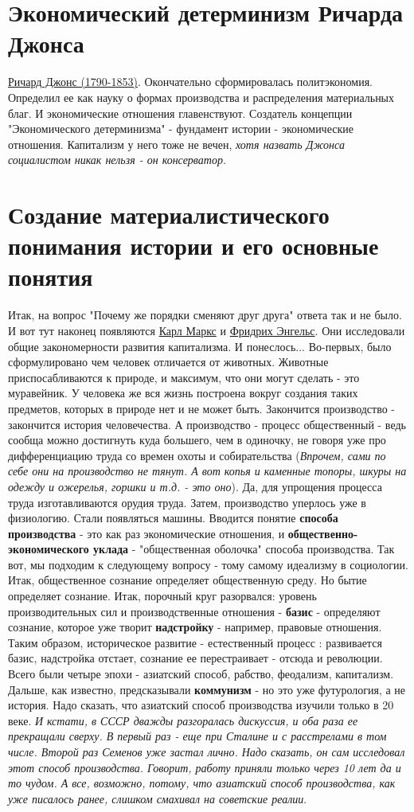 \section{Экономический детерминизм Ричарда Джонса}
\underline{Ричард Джонс (1790-1853)}. Окончательно сформировалась политэкономия. Определил ее как науку о формах производства и распределения материальных благ. И экономические отношения главенствуют. Создатель концепции "Экономического детерминизма" - фундамент истории - экономические отношения. Капитализм у  него тоже не вечен, \textit{хотя назвать Джонса социалистом никак нельзя - он консерватор}. 

\section{Создание материалистического понимания истории и его основные понятия}
Итак, на вопрос "Почему же порядки сменяют друг друга" ответа так и не было. И вот тут наконец появляются \underline{Карл Маркс} и \underline{Фридрих Энгельс}. Они исследовали общие закономерности развития капитализма. И понеслось... Во-первых, было сформулировано чем человек отличается от животных. Животные приспосабливаются к природе, и максимум, что они могут сделать - это муравейник. У человека же вся жизнь построена вокруг создания таких предметов, которых в природе нет и не может быть. Закончится производство - закончится история человечества. А производство - процесс общественный - ведь сообща можно достигнуть куда большего, чем в одиночку, не говоря уже про дифференциацию труда со времен охоты и собирательства (\textit{Впрочем, сами по себе они на производство не тянут. А вот копья и каменные топоры, шкуры на одежду и ожерелья, горшки и т.д.  - это оно}). Да, для упрощения процесса труда изготавливаются орудия труда. Затем, производство уперлось уже в физиологию. Стали появляться машины. Вводится понятие \textbf{способа производства} - это как раз экономические отношения, и \textbf{общественно-экономического уклада} - "общественная оболочка" способа производства. Так вот, мы подходим к следующему вопросу - тому самому идеализму в социологии. Итак, общественное сознание определяет общественную среду. Но бытие определяет сознание. Итак, порочный круг разорвался: уровень производительных сил и производственные отношения - \textbf{базис} - определяют сознание, которое уже творит \textbf{надстройку} - например, правовые отношения. Таким образом, историческое развитие - естественный процесс : развивается базис, надстройка отстает, сознание ее перестраивает - отсюда и революции. Всего были четыре эпохи - азиатский способ, рабство, феодализм, капитализм. Дальше, как известно, предсказывали \textbf{коммунизм}  - но это уже футурология, а не история. Надо сказать, что азиатский способ производства изучили только в 20 веке. \textit{И кстати, в СССР  дважды разгоралась дискуссия, и оба раза ее прекращали сверху. В первый раз - еще при Сталине и с расстрелами в том числе. Второй раз Семенов уже застал лично. Надо сказать, он сам исследовал этот способ производства. Говорит, работу приняли только через 10 лет да и то чудом. А все, возможно, потому, что азиатский способ производства, как уже писалось ранее, слишком смахивал на советские реалии}.

